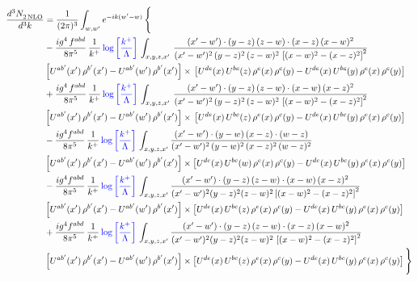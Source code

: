 \documentclass[9pt]{article}
\numberwithin{equation}{section}
\begin{document}
\begin{align}
   \frac{d^{3}N_{2\,\rm NLO}^{\rm}}{d^{3}k}  & = \frac{1}{(2\pi)^{3}}  \int_{w, w^\prime} e^{-ik(w^\prime-w)}\, \Bigg\{\notag \\ &  -\frac{ig^{4}\, f^{abd}}{8\pi^{5}}\, \frac{1}{k^{+}}\,{\color{blue}\log{\left[\frac{k^{+}}{\Lambda}\right]}}\, \int_{x,y,z,x'}\,\frac{(x'-w')\cdot  (y-z)\, (z-w)\cdot (x-z)\, (x-w)^{2}}{(x'-w')^{2}\, (y-z)^{2}\, (z-w)^{2}\,\left[(x-w)^{2}-(x-z)^{2}\right]^{2}}\, \notag \\ & \left[U^{ab'}(x')\,\rho^{b'}(x')-U^{ab'}(w')\, \rho^{b'}(x')\right]\times\,\left[U^{de}(x)\,U^{bc}(z)\, \rho^{e}(x)\,\rho^{c}(y)-U^{de}(x)\,U^{bc}(y)\,\rho^{e}(x)\,\rho^{c}(y)\right]\notag \\ &   + \frac{ig^{4}\, f^{abd}}{8\pi^{5}}\, \frac{1}{k^{+}}\,{\color{blue}\log{\left[\frac{k^{+}}{\Lambda}\right]}}\, \int_{x,y,z,x'}\,\frac{(x'-w')\cdot  (y-z)\, (z-w)\cdot (x-w)\, (x-z)^{2}}{(x'-w')^{2}\, (y-z)^{2}\, (z-w)^{2}\,\left[(x-w)^{2}-(x-z)^{2}\right]^{2}}\, \notag \\ & \left[U^{ab'}(x')\,\rho^{b'}(x')-U^{ab'}(w')\, \rho^{b'}(x')\right]\times\,\left[U^{de}(x)\,U^{bc}(z)\, \rho^{e}(x)\,\rho^{c}(y)-U^{de}(x)\,U^{bc}(y)\,\rho^{e}(x)\,\rho^{c}(y)\right]\notag \\ & -\frac{ig^{4}f^{abd}}{8\pi^{5}}\,\frac{1}{k^{+}}\,{\color{blue}\log{\left[\frac{k^{+}}{\Lambda}\right]}}\,\int_{x,y,z,x'}
\frac{(x'-w')\cdot(y-w)\,(x-z)\cdot(w-z)}{(x'-w')^{2}\,(y-w)^{2}\,(x-z)^{2}\,(w-z)^{2}}\notag \\ & \left[U^{ab'}(x')\,\rho^{b'}(x')-U^{ab'}(w')\, \rho^{b'}(x')\right]\times \left[U^{de}(x)\,U^{bc}(w)\, \rho^{e}(x)\,\rho^{c}(y)-U^{de}(x)\,U^{bc}(y)\,\rho^{e}(x)\,\rho^{c}(y)\right]\notag \\ & -\frac{ig^{4}f^{abd}}{8\pi^{5}}\,\frac{1}{k^{+}}\,{\color{blue}\log{\left[\frac{k^{+}}{\Lambda}\right]}}\,\int_{x,y,z,x'}
\frac{(x'-w')\cdot(y-z)\,(z-w)\cdot(x-w)\,(x-z)^{2}}{(x'-w')^{2}(y-z)^{2}(z-w)^{2}\left[(x-w)^{2}-(x-z)^{2}\right]^{2}}\notag \\ & \left[U^{ab'}(x')\,\rho^{b'}(x')-U^{ab'}(w')\, \rho^{b'}(x')\right]\times \left[U^{de}(x)\,U^{bc}(z)\, \rho^{e}(x)\,\rho^{c}(y)-U^{de}(x)\,U^{bc}(y)\,\rho^{e}(x)\,\rho^{c}(y)\right]\notag \\ & +\frac{ig^{4}f^{abd}}{8\pi^{5}}\,\frac{1}{k^{+}}\,{\color{blue}\log{\left[\frac{k^{+}}{\Lambda}\right]}}\,\int_{x,y,z,x'}
\frac{(x'-w')\cdot(y-z)\,(z-w)\cdot(x-z)\,(x-w)^{2}}{(x'-w')^{2}(y-z)^{2}(z-w)^{2}\,\left[(x-w)^{2}-(x-z)^{2}\right]^{2}}\notag \\ & \left[U^{ab'}(x')\,\rho^{b'}(x')-U^{ab'}(w')\, \rho^{b'}(x')\right]\times \left[U^{de}(x)\,U^{bc}(z)\, \rho^{e}(x)\,\rho^{c}(y)-U^{de}(x)\,U^{bc}(y)\,\rho^{e}(x)\,\rho^{c}(y)\right]\Bigg\} 
\end{align}   
\end{document}
